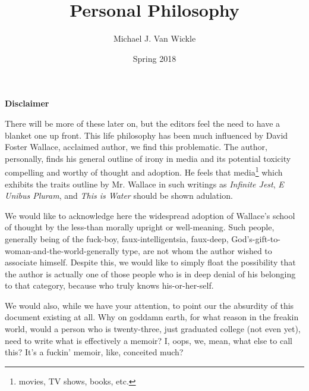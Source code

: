 

\pagecolor{WhiteSmoke}

\title{Personal Philosophy}
\author{Michael J. Van Wickle}
\date{Spring 2018}


\frontmatter
\pagestyle{empty}

\begin{titlepage}
\customtitlepage
\end{titlepage}

\posttitlepage
\newpage

\renewcommand{\thefootnote}{\fnsymbol{footnote}}
\pagestyle{fancy}
\fancyhf{}
\renewcommand{\chaptermark}[1]{\markboth{#1}{}}
\renewcommand{\sectionmark}[1]{\markright{#1}}
\fancyhead[ER]{\nouppercase{\rightmark}}
\fancyhead[OL]{\nouppercase{\leftmark}}
\fancyfoot[EL,OR]{\thepage}

\setlength{\parskip}{\baselineskip}
\newcommand{\editorsnote}{Disclaimer}
{\centering\bfseries\Large \editorsnote}
\markright{\editorsnote}\addcontentsline{toc}{chapter}{\editorsnote}

\vspace*{\fill}
{\normalsize There will be more of these later on, but the editors feel the need to have a blanket one up front.
This life philosophy has been much influenced by David Foster Wallace, acclaimed author, we find this problematic.
The author, personally, finds his general outline of irony in media and its potential toxicity compelling and worthy of thought and adoption.
He feels that media\footnote{movies, TV shows, books, etc.} which exhibits the traits outline by Mr. Wallace in such writings as \textit{Infinite Jest}, \textit{E Unibus Pluram}, and \textit{This is Water} should be shown adulation.

We would like to acknowledge here the widespread adoption of Wallace's school of thought by the less-than morally upright or well-meaning.
Such people, generally being of the fuck-boy, faux-intelligentsia, faux-deep, God's-gift-to-woman-and-the-world-generally type, are not whom the author wished to associate himself.
Despite this, we would like to simply float the possibility that the author is actually one of those people who is in deep denial of his belonging to that category, because who truly knows his-or-her-self.

We would also, while we have your attention, to point our the absurdity of this document existing at all.
Why on goddamn earth, for what reason in the freakin world, would a person who is twenty-three, just graduated college (not even yet), need to write what is effectively a memoir?
I, oops, we, mean, what else to call this?
It's a fuckin' memoir, like, conceited much?}

